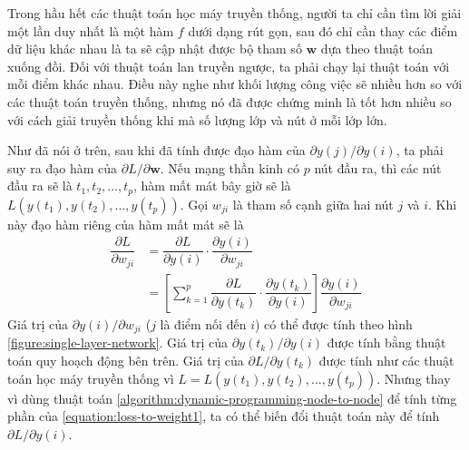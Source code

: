 Trong hầu hết các thuật toán học máy truyền thống, người ta chỉ cần tìm lời giải một lần duy nhất là một hàm $f$ dưới dạng rút gọn, sau đó chỉ cần thay các điểm dữ liệu khác nhau là ta sẽ cập nhật được bộ tham số $\mathbf{w}$ dựa theo thuật toán xuống đồi. Đối với thuật toán lan truyền ngược, ta phải chạy lại thuật toán với mỗi điểm khác nhau. Điều này nghe như khối lượng công việc sẽ nhiều hơn so với các thuật toán truyền thống, nhưng nó đã được chứng minh là tốt hơn nhiều so với cách giải truyền thống khi mà số lượng lớp và nút ở mỗi lớp lớn.

Như đã nói ở trên, sau khi đã tính được đạo hàm của $\partial y(j)/\partial y(i)$, ta phải suy ra đạo hàm của $\partial L/\partial\mathbf{w}$. Nếu mạng thần kinh có $p$ nút đầu ra, thì các nút đầu ra sẽ là $t_1,t_2,\dots,t_p$, hàm mất mát bây giờ sẽ là $L(y(t_1),y(t_2),\dots,y(t_p))$. Gọi $w_{ji}$ là tham số cạnh giữa hai nút $j$ và $i$. Khi này đạo hàm riêng của hàm mất mát sẽ là
\begin{align}
    \dfrac{\partial L}{\partial w_{ji}} & =
    \dfrac{\partial L}{\partial y(i)}\cdot\dfrac{\partial y(i)}{\partial w_{ji}\label{equation:loss-to-weight}}                                                                                                          \\
                                        & =\left[\sum^p_{k=1}\dfrac{\partial L}{\partial y(t_k)}\cdot\dfrac{\partial y(t_k)}{\partial y(i)}\right]\dfrac{\partial y(i)}{\partial w_{ji}}\label{equation:loss-to-weight1}
\end{align}
Giá trị của $\partial y(i)/\partial w_{ji}$ ($j$ là điểm nối đến $i$) có thể được tính theo hình \ref{figure:single-layer-network}. Giá trị của $\partial y(t_k)/\partial y(i)$ được tính bằng thuật toán quy hoạch động bên trên. Giá trị của $\partial L/\partial y(t_k)$ được tính như các thuật toán học máy truyền thống vì $L=L(y(t_1),y(t_2),\dots,y(t_p))$. Nhưng thay vì dùng thuật toán \ref{algorithm:dynamic-programming-node-to-node} để tính từng phần của \ref{equation:loss-to-weight1}, ta có thể biến đổi thuật toán này để tính $\partial L/\partial y(i)$.

